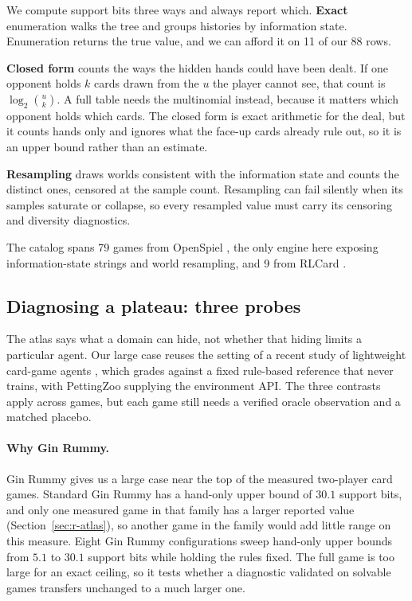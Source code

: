\documentclass{article}
\begin{document}
We compute support bits three ways and always report which. \textbf{Exact} enumeration walks the tree and groups histories by information state. Enumeration returns the true value, and we can afford it on 11 of our 88 rows.

\textbf{Closed form} counts the ways the hidden hands could have been dealt. If one opponent holds $k$ cards drawn from the $u$ the player cannot see, that count is $\log_2\binom{u}{k}$. A full table needs the multinomial instead, because it matters which opponent holds which cards. The closed form is exact arithmetic for the deal, but it counts hands only and ignores what the face-up cards already rule out, so it is an upper bound rather than an estimate.

\textbf{Resampling} draws worlds consistent with the information state and counts the distinct ones, censored at the sample count. Resampling can fail silently when its samples saturate or collapse, so every resampled value must carry its censoring and diversity diagnostics.

The catalog spans 79 games from OpenSpiel \citep{openspiel}, the only engine here exposing information-state strings and world resampling, and 9 from RLCard \citep{rlcard}.

\subsection{Diagnosing a plateau: three probes}
\label{sec:m-probes}

The atlas says what a domain can hide, not whether that hiding limits a particular agent. Our large case reuses the setting of a recent study of lightweight card-game agents \citep{goldstandard}, which grades against a fixed rule-based reference that never trains, with PettingZoo \citep{pettingzoo} supplying the environment API. The three contrasts apply across games, but each game still needs a verified oracle observation and a matched placebo.

\paragraph{Why Gin Rummy.} Gin Rummy gives us a large case near the top of the measured two-player card games. Standard Gin Rummy has a hand-only upper bound of $30.1$ support bits, and only one measured game in that family has a larger reported value (Section~\ref{sec:r-atlas}), so another game in the family would add little range on this measure. Eight Gin Rummy configurations sweep hand-only upper bounds from $5.1$ to $30.1$ support bits while holding the rules fixed. The full game is too large for an exact ceiling, so it tests whether a diagnostic validated on solvable games transfers unchanged to a much larger one.
\end{document}
